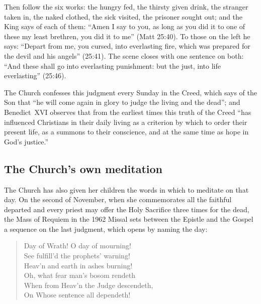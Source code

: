 Then follow the six works: the hungry fed, the thirsty given drink, the stranger taken in, the naked clothed, the sick visited, the prisoner sought out; and the King says of each of them: ``Amen I say to you, as long as you did it to one of these my least brethren, you did it to me'' (Matt 25:40). To those on the left he says: ``Depart from me, you cursed, into everlasting fire, which was prepared for the devil and his angels'' (25:41). The scene closes with one sentence on both: ``And these shall go into everlasting punishment: but the just, into life everlasting'' (25:46).

The Church confesses this judgment every Sunday in the Creed, which says of the Son that ``he will come again in glory to judge the living and the dead''; and Benedict~XVI observes that from the earliest times this truth of the Creed ``has influenced Christians in their daily living as a criterion by which to order their present life, as a summons to their conscience, and at the same time as hope in God's justice.''

\subsection{The Church's own meditation}

The Church has also given her children the words in which to meditate on that day. On the second of November, when she commemorates all the faithful departed and every priest may offer the Holy Sacrifice three times for the dead, the Mass of Requiem in the 1962 Missal sets between the Epistle and the Gospel a sequence on the last judgment, which opens by naming the day:

\begin{quote}

\medskip
Day of Wrath! O day of mourning!\\
See fulfill'd the prophets' warning!\\
Heav'n and earth in ashes burning!\\
Oh, what fear man's bosom rendeth\\
When from Heav'n the Judge descendeth,\\
On Whose sentence all dependeth!
\end{quote}

